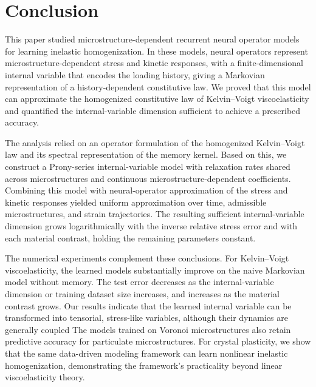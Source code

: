 \documentclass[3p, 12pt, preprint]{elsarticle}
\begin{document}
\section{Conclusion}\label{sec:conclusion}

This paper studied microstructure-dependent recurrent neural operator models for learning inelastic homogenization. In these models, neural operators represent microstructure-dependent stress and kinetic responses, with a finite-dimensional internal variable that encodes the loading history, giving a Markovian representation of a history-dependent constitutive law. We proved that this model can approximate the homogenized constitutive law of Kelvin--Voigt viscoelasticity and quantified the internal-variable dimension sufficient to achieve a prescribed accuracy.

The analysis relied on an operator formulation of the homogenized Kelvin--Voigt law and its spectral representation of the memory kernel. {\color{blue} Based on this, we construct a Prony-series internal-variable model with relaxation rates shared across microstructures and continuous microstructure-dependent coefficients. Combining this model with neural-operator approximation of the stress and kinetic responses yielded uniform approximation over time, admissible microstructures, and strain trajectories. The resulting sufficient internal-variable dimension grows logarithmically with the inverse relative stress error and with each material contrast, holding the remaining parameters constant.}

The numerical experiments complement these conclusions. For Kelvin--Voigt viscoelasticity, the learned models substantially improve on the naive Markovian model without memory. The test error decreases as the internal-variable dimension or training dataset size increases, and increases as the material contrast grows. Our results indicate that the learned internal variable can be transformed into tensorial, stress-like variables, although their dynamics are generally coupled  The models trained on Voronoi microstructures also retain predictive accuracy for particulate microstructures. For crystal plasticity, we show that the same data-driven modeling framework can learn nonlinear inelastic homogenization, demonstrating the framework's practicality beyond linear viscoelasticity theory.
\end{document}
